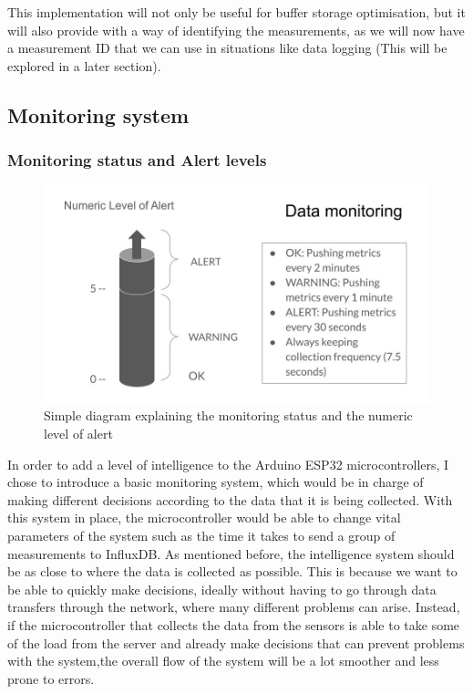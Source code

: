 \documentclass[12pt]{article}
\begin{document}
This implementation will not only be useful for buffer storage optimisation, but it will also provide with a way of identifying the measurements, as we will now have a measurement ID that we can use in situations like data logging (This will be explored in a later section).

\subsection{Monitoring system}

\subsubsection{Monitoring status and Alert levels}

\begin{figure}[h]
\includegraphics[scale=0.35]{monitoring}
\centering
\caption{Simple diagram explaining the monitoring status and the numeric level of alert}
\label{fig:monitoring}
\end{figure}

In order to add a level of intelligence to the Arduino ESP32 microcontrollers, I chose to introduce a basic monitoring system, which would be in charge of making different decisions according to the data that it is being collected. With this system in place, the microcontroller would be able to change vital parameters of the system such as the time it takes to send a group of measurements to InfluxDB. As mentioned before, the intelligence system should be as close to where the data is collected as possible. This is because we want to be able to quickly make decisions, ideally without having to go through data transfers through the network, where many different problems can arise. Instead, if the microcontroller that collects the data from the sensors is able to take some of the load from the server and already make decisions that can prevent problems with the system,the overall flow of the system will be a lot smoother and less prone to errors.\par
\end{document}
